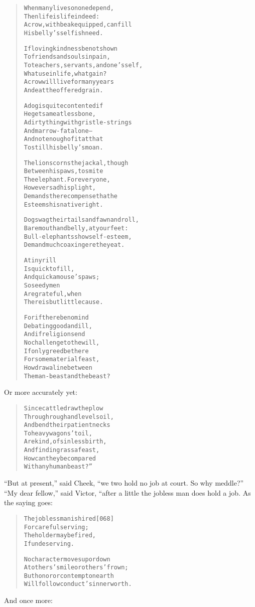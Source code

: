 \documentclass[article, twoside, 14pt]{memoir}
\renewenvironment{verbatim}{%
\begin{quote}%
\vskip -10pt%
\begin{alltt}\normalfont\large}{\end{alltt}%
\end{quote}%
\vskip -10pt
} %
\begin{document}
\begin{verbatim}
When many lives on one depend,
    Then life is life indeed:
A crow, with beak equipped, can fill
    His belly's selfish need.

If loving kindness be not shown
    To friends and souls in pain,
To teachers, servants, and one's self,
    What use in life, what gain?
A crow will live for many years
    And eat the offered grain.

A dog is quite contented if
    He gets a meatless bone,
A dirty thing with gristle-strings
    And marrow-fat alone--
And not enough of it at that
    To still his belly's moan.

The lion scorns the jackal, though
    Between his paws, to smite
The elephant. For everyone,
    However sad his plight,
Demands the recompense that he
    Esteems his native right.

Dogs wag their tails and fawn and roll,
    Bare mouth and belly, at your feet:
Bull-elephants show self-esteem,
    Demand much coaxing ere they eat.

A tiny rill
Is quick to fill,
    And quick a mouse's paws;
So seedy men
Are grateful, when
    There is but little cause.

For if there be no mind
    Debating good and ill,
And if religion send
    No challenge to the will,
If only greed be there
    For some material feast,
How draw a line between
    The man-beast and the beast?
\end{verbatim}
Or more accurately yet:

\begin{verbatim}
Since cattle draw the plow
    Through rough and level soil,
And bend their patient necks
    To heavy wagons' toil,
Are kind, of sinless birth,
    And find in grass a feast,
How can they be compared
    With any human beast?”
\end{verbatim}
``But at present,'' said Cheek,
``we two hold no job at court. So why meddle?'' ``My dear fellow,''
said Victor, “after a little the jobless man does hold a job. As
the saying goes:

\begin{verbatim}
The jobless man is hired                                [068]
    For careful serving;
The holder may be fired,
    If undeserving.

No character moves up or down
At others' smile or others' frown;
But honor or contempt on earth
Will follow conduct's inner worth.
\end{verbatim}
And once more:
\end{document}
